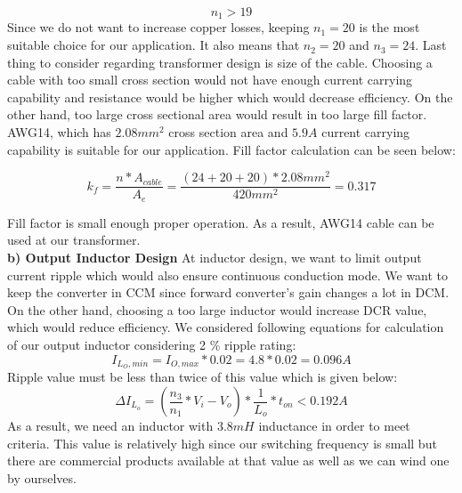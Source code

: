 \documentclass{article}
\newcommand\tab[1][1cm]{\hspace*{#1}}
\begin{document}
\begin{equation}
    n_1>19
\end{equation}
\tab Since we do not want to increase copper losses, keeping $n_1=20$ is the most suitable choice for our application. It also means that $n_2=20$ and $n_3=24$.
\newline \tab Last thing to consider regarding transformer design is size of the cable. Choosing a cable with too small cross section would not have enough current carrying capability and resistance would be higher which would decrease efficiency. On the other hand, too large cross sectional area would result in too large fill factor.
\newline\tab AWG14, which has $2.08 mm^2$ cross section area and $5.9 A$ current carrying capability is suitable for our application. Fill factor calculation can be seen below:

\begin{equation}
    k_f=\frac{n*A_{cable}}{A_e}=\frac{(24+20+20)*2.08 mm^2}{420 mm^2}=0.317
\end{equation}

\tab Fill factor is small enough proper operation. As a result, AWG14 cable can be used at our transformer.\\

\tab\textbf{b) Output Inductor Design}
\newline \tab At inductor design, we want to limit output current ripple which would also ensure continuous conduction mode. We want to keep the converter in CCM since forward converter's gain changes a lot in DCM. On the other hand, choosing a too large inductor would increase DCR value, which would reduce efficiency. We considered following equations for calculation of our output inductor considering 2 \% ripple rating:
\begin{equation}
    I_{L_O,min}=I_{O,max}*0.02 =4.8*0.02=0.096 A
\end{equation}
Ripple value must be less than twice of this value which is given below:
\begin{equation}
{\displaystyle \Delta }I_{L_o}=(\frac{n_3}{n_1}*V_i-V_o)*\frac{1}{L_o}*t_{on}<0.192 A
\end{equation}
\tab As a result, we need an inductor with $3.8 mH$ inductance in order to meet criteria. This value is relatively high since our switching frequency is small but there are commercial products available at that value as well as we can wind one by ourselves.
\end{document}
